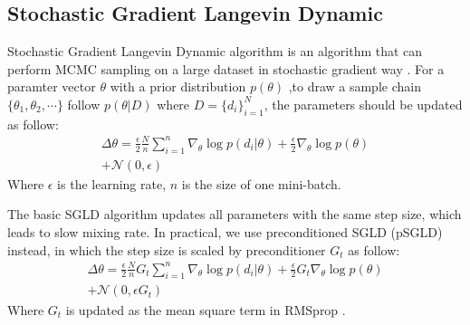 \subsection{Stochastic Gradient Langevin Dynamic}
Stochastic Gradient Langevin Dynamic algorithm  is an algorithm that can perform MCMC sampling on a large dataset in stochastic gradient way \cite{SGLD}. For a paramter vector $\theta$ with a prior distribution $p(\theta)$ ,to draw a sample chain $\{\theta_1,\theta_2,\cdots\}$ follow $p(\theta|D)$ where $D=\{d_i\}^N_{i=1}$, the parameters should be updated as follow:
\begin{equation}
   \label{eq:sgld} 
   \begin{aligned}
\Delta\theta =\frac{\epsilon}{2}\frac{N}{n}\sum_{i=1}^{n}\nabla_\theta\log p(d_i|\theta)+\frac{\epsilon}{2}\nabla_\theta\log p(\theta)\\
+\mathcal{N}(0,\epsilon)
\end{aligned}
\end{equation}
Where $\epsilon$ is the learning rate, $n$ is the size of one mini-batch. 

The basic SGLD algorithm updates all parameters with the same step size, which leads to slow mixing rate. In practical, we use preconditioned SGLD (pSGLD) instead, in which the step size is scaled by preconditioner $G_t$ as follow:
\begin{equation}
   \label{eq:psgld} 
   \begin{aligned}
      \Delta\theta =\frac{\epsilon}{2}\frac{N}{n}G_t\sum_{i=1}^{n}\nabla_\theta\log p(d_i|\theta)+\frac{\epsilon}{2}G_t\nabla_\theta\log p(\theta)\\
      +\mathcal{N}(0,\epsilon G_t)
   \end{aligned}
\end{equation}
Where $G_t$ is updated as the mean square term in RMSprop \cite{rmsprop}.

